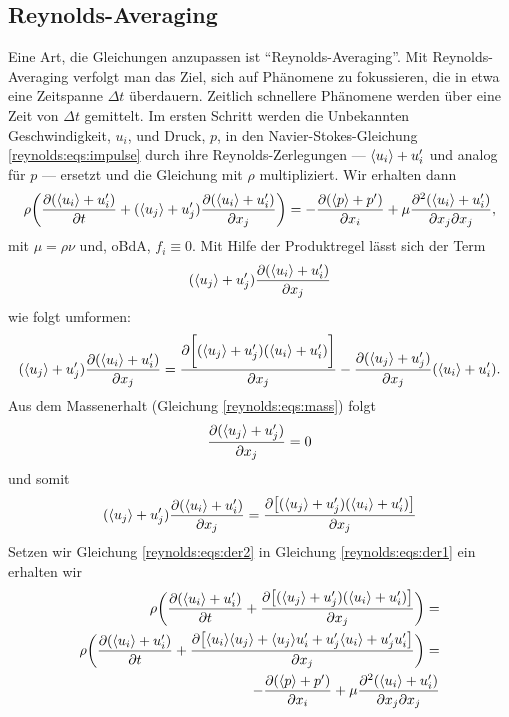 \subsection{Reynolds-Averaging}
Eine Art, die Gleichungen anzupassen ist ``Reynolds-Averaging''. Mit Reynolds-Averaging verfolgt
man das Ziel, sich auf Phänomene zu fokussieren, die in etwa eine Zeitspanne $\Delta t$ überdauern.
Zeitlich schnellere Phänomene werden über eine Zeit von $\Delta t$ gemittelt.
%
Im ersten Schritt werden die Unbekannten Geschwindigkeit, $u_i$, und Druck, $p$, in den Navier-Stokes-Gleichung
\eqref{reynolds:eqs:impulse} durch ihre Reynolds-Zerlegungen --- $\langle u_i \rangle + u_i'$ und analog für $p$ --- ersetzt und die Gleichung
mit $\rho$ multipliziert. Wir erhalten dann
%
\begin{equation}
    \label{reynolds:eqs:der1}
    \rho \biggl( \frac{\partial ( \langle u_i \rangle + u_i' )}{\partial t} + (\langle u_j \rangle + u_j' ) \frac{\partial ( \langle u_i \rangle + u_i' )}{\partial x_j} \biggr) =
        - \frac{\partial ( \langle p \rangle + p' )}{\partial x_i} + 
        \mu \frac{\partial^2 ( \langle u_i \rangle + u_i' )}{\partial x_j \partial x_j},
\end{equation}
%
mit $\mu = \rho \nu$ und, oBdA, $f_i \equiv 0$.
%
Mit Hilfe der Produktregel lässt sich der Term
%
$$( \langle u_j \rangle + u_j' ) \frac{\partial ( \langle u_i \rangle + u_i' )}{\partial x_j}$$
%
wie folgt umformen:
%
\begin{equation}
    ( \langle u_j \rangle + u_j' ) \frac{\partial ( \langle u_i \rangle + u_i' )}{\partial x_j} =
        \frac{\partial \biggl[ ( \langle u_j \rangle + u_j' ) ( \langle u_i \rangle + u_i' ) \biggr]}{\partial x_j}
        - \frac{\partial ( \langle u_j \rangle + u_j' )}{\partial x_j} ( \langle u_i \rangle + u_i' ).
\end{equation}
%
Aus dem Massenerhalt (Gleichung \eqref{reynolds:eqs:mass}) folgt
%
\begin{equation}
    \frac{\partial ( \langle u_j \rangle + u_j' )}{\partial x_j} = 0
\end{equation}
%
und somit
%
\begin{equation}
    \label{reynolds:eqs:der2}
    ( \langle u_j \rangle + u_j' ) \frac{\partial ( \langle u_i \rangle + u_i' )}{\partial x_j} =
        \frac{\partial \bigl[ ( \langle u_j \rangle + u_j' ) ( \langle u_i \rangle + u_i' ) \bigr]}{\partial x_j}
\end{equation}
%
Setzen wir Gleichung \eqref{reynolds:eqs:der2} in Gleichung \eqref{reynolds:eqs:der1} ein erhalten wir
%
\begin{align}
    \rho \biggl(
            \frac{\partial ( \langle u_i \rangle + u_i' )}{\partial t} +
            \frac{\partial \bigl[ ( \langle u_j \rangle + u_j' ) ( \langle u_i \rangle + u_i' ) \bigr]}{\partial x_j}
        \biggr) = \\
    \rho \biggl(
            \frac{\partial ( \langle u_i \rangle + u_i' )}{\partial t} +
            \frac{\partial \bigl[ \langle u_i \rangle \langle u_j \rangle  + \langle u_j \rangle u_i' + u_j' \langle u_i \rangle + u_j' u_i' \bigr]}{\partial x_j}
        \biggr) = \\
    - \frac{\partial ( \langle p \rangle + p' )}{\partial x_i} + 
    \mu \frac{\partial^2 ( \langle u_i \rangle + u_i' )}{\partial x_j \partial x_j}
\end{align}
